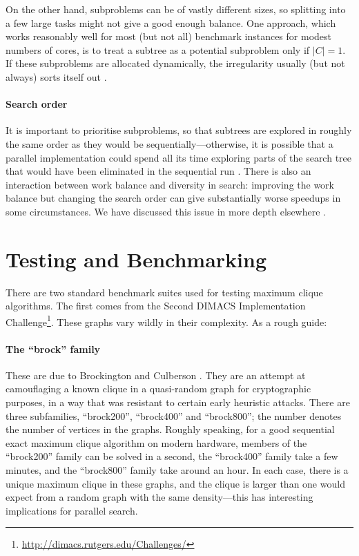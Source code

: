 \documentclass[a4paper]{article}
\begin{document}
On the other hand, subproblems can be of vastly different sizes, so splitting into a few large tasks
might not give a good enough balance. One approach, which works reasonably well for most (but not
all) benchmark instances for modest numbers of cores, is to treat a subtree as a potential
subproblem only if $|C| = 1$. If these subproblems are allocated dynamically, the irregularity
usually (but not always) sorts itself out \cite{Regin:2013,Depolli:2013,McCreesh:2013}.

\paragraph{Search order} It is important to prioritise subproblems, so that subtrees are explored in
roughly the same order as they would be sequentially---otherwise, it is possible that a parallel
implementation could spend all its time exploring parts of the search tree that would have been
eliminated in the sequential run \cite{Trienekens:1990,deBruin:1995}.  There is also an interaction
between work balance and diversity in search: improving the work balance but changing the search
order can give substantially worse speedups in some circumstances.  We have discussed this issue in
more depth elsewhere \cite{McCreesh:2014.parallel}.

\section{Testing and Benchmarking}

There are two standard benchmark suites used for testing maximum clique algorithms.  The first comes
from the Second DIMACS Implementation
Challenge\footnote{\url{http://dimacs.rutgers.edu/Challenges/}}. These graphs vary wildly in their
complexity. As a rough guide:

\paragraph{The ``brock'' family} These are due to Brockington and Culberson
\cite{Brockington:1996}. They are an attempt at camouflaging a known clique in a quasi-random graph
for cryptographic purposes, in a way that was resistant to certain early heuristic attacks.  There
are three subfamilies, ``brock200'', ``brock400'' and ``brock800''; the number denotes the number of
vertices in the graphs. Roughly speaking, for a good sequential exact maximum clique algorithm on modern
hardware, members of the ``brock200'' family can be solved in a second, the ``brock400'' family take
a few minutes, and the ``brock800'' family take around an hour.  In each case, there is a unique
maximum clique in these graphs, and the clique is larger than one would expect from a random graph
with the same density---this has interesting implications for parallel search.
\end{document}
